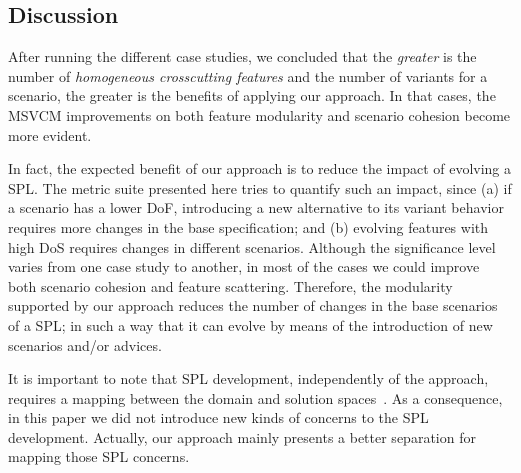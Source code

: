 \subsection{Discussion}

After running the different case studies, we concluded that the 
\emph{greater} is the number of \emph{homogeneous crosscutting features} and
the number of variants for a scenario, the greater is the 
benefits of applying our approach. In that cases, the MSVCM improvements on 
both feature modularity and scenario cohesion become more evident. 

In fact, the expected benefit of our approach is to reduce the impact of evolving
a SPL. The metric suite presented here tries to quantify such an impact, since
(a) if a scenario has a lower DoF, introducing a new alternative to its variant
behavior requires more changes in the base specification; and (b) evolving
features with high DoS requires changes in different scenarios. Although the
significance level varies from one case study to another, in most of the cases we
could improve both scenario cohesion and feature scattering. Therefore, the
modularity supported by our approach reduces the number of changes in the base
scenarios of a SPL; in such a way that it can evolve by means of the
introduction of new scenarios and/or advices.

It is important to note that SPL development, independently of the approach, requires a
mapping between the domain and solution spaces~\cite{Czarnecki:2000aa,Jayaraman:2007aa}. As a
consequence, in this paper we did not introduce new kinds of concerns to the SPL
development. Actually, our approach mainly presents a better separation for
mapping those SPL concerns. 


